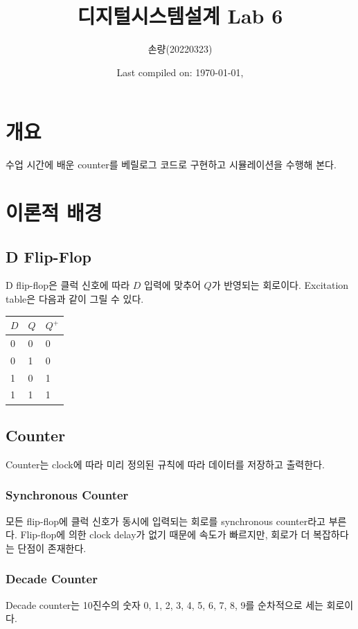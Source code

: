 \documentclass{scrartcl}
\title{디지털시스템설계 Lab 6}
\author{손량(20220323)}
\date{Last compiled on: \today, \currenttime}
\begin{document}
\maketitle

\section{개요}
수업 시간에 배운 counter를 베릴로그 코드로 구현하고 시뮬레이션을 수행해 본다.

\section{이론적 배경}
\subsection{D Flip-Flop}
D flip-flop은 클럭 신호에 따라 \(D\) 입력에 맞추어 \(Q\)가 반영되는 회로이다.
Excitation table은 다음과 같이 그릴 수 있다.
\begin{table}[H]
  \centering
  \begin{tabular}{ll|l}
    \hline
    \(D\) & \(Q\) & \(Q^+\) \\
    \hline
    0 & 0 & 0 \\
    0 & 1 & 0 \\
    1 & 0 & 1 \\
    1 & 1 & 1 \\
    \hline
  \end{tabular}
\end{table}

\subsection{Counter}
Counter는 clock에 따라 미리 정의된 규칙에 따라 데이터를 저장하고 출력한다.

\subsubsection{Synchronous Counter}
모든 flip-flop에 클럭 신호가 동시에 입력되는 회로를 synchronous counter라고 부른다.
Flip-flop에 의한 clock delay가 없기 때문에 속도가 빠르지만, 회로가 더 복잡하다는 단점이 존재한다.

\subsubsection{Decade Counter}
Decade counter는 10진수의 숫자 0, 1, 2, 3, 4, 5, 6, 7, 8, 9를 순차적으로 세는 회로이다.
\end{document}
